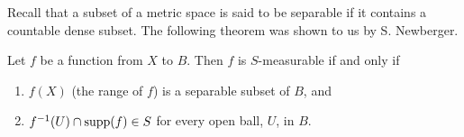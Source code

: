 Recall that a subset of a metric space is said to be separable if it contains a countable dense subset. The following theorem was shown to us by S. Newberger.

\begin{theorem}
\label{thm:characterization of meas func}
Let $f$ be a function from $X$ to $B$. Then $f$ is $S$-measurable if and only if
\begin{enumerate}[label=\arabic*),ref=\arabic*)]
    \item \label{thm:item:sep range} $f(X)$ (the range of $f$) is a separable subset of $B$, and
    \item \label{thm:item:car} $f^{-1}(U) \cap \operatorname{supp}(f) \in S$ for every open ball, $U$, in $B$.
\end{enumerate}
\end{theorem}

